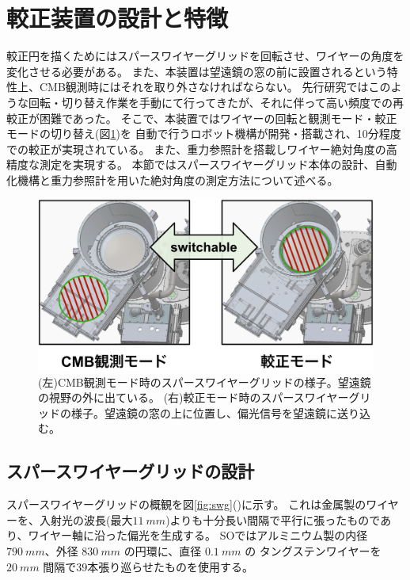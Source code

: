 \documentclass[../../main.tex]{subfiles}
\begin{document}
\section{較正装置の設計と特徴}
較正円を描くためにはスパースワイヤーグリッドを回転させ、ワイヤーの角度を変化させる必要がある。
また、本装置は望遠鏡の窓の前に設置されるという特性上、CMB観測時にはそれを取り外さなければならない。
先行研究ではこのような回転・切り替え作業を手動にて行ってきたが、それに伴って高い頻度での再較正が困難であった。
そこで、本装置ではワイヤーの回転と観測モード・較正モードの切り替え(図\ref{fig:wiregrid_modes})を
自動で行うロボット機構が開発・搭載され、10分程度での較正が実現されている。
また、重力参照計を搭載しワイヤー絶対角度の高精度な測定を実現する。
本節ではスパースワイヤーグリッド本体の設計、自動化機構と重力参照計を用いた絶対角度の測定方法について述べる。
\begin{figure}[H]
    \centering
    \includegraphics[width=0.85\columnwidth]{wiregrid/wiregrid_mode_switch.pdf}
    \caption{(左)CMB観測モード時のスパースワイヤーグリッドの様子。望遠鏡の視野の外に出ている。
    (右)較正モード時のスパースワイヤーグリッドの様子。望遠鏡の窓の上に位置し、偏光信号を望遠鏡に送り込む。
    }
    \label{fig:wiregrid_modes}
\end{figure}
\subsection{スパースワイヤーグリッドの設計}
\label{subsec:wg_design}
スパースワイヤーグリッドの概観を図\ref{fig:swg}()に示す。
これは金属製のワイヤーを、入射光の波長(最大$\SI{11}{mm}$)よりも十分長い間隔で平行に張ったものであり、ワイヤー軸に沿った偏光を生成する。
SOではアルミニウム製の内径$\SI{790}{mm}$、外径 $\SI{830}{mm}$ の円環に、直径 $\SI{0.1}{mm}$ の
タングステンワイヤーを $\SI{20}{mm}$ 間隔で$39$本張り巡らせたものを使用する\cite{swg:murata}。
\end{document}
